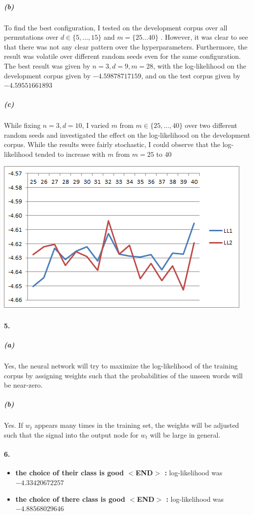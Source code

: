 \documentclass[10pt,letter]{article}
\begin{document}
\subparagraph*{(b)}
To find the best configuration, I tested on the development corpus over all permutations over $d\in\{5,...,15\}$ and $m=\{25...40\}$ . However, it was clear to see that there was not any clear pattern over the hyperparameters. Furthermore, the result was volatile over different random seeds even for the same configuration. The best result was given by $n=3, d=9, m=28$, with the log-likelihood on the development corpus given by $-4.59878717159$, and on the test corpus given by $-4.59551661893$
\subparagraph*{(c)}

While fixing $n=3, d=10$, I varied $m$ from $m\in\{25,...,40\}$ over two different random seeds and investigated the effect on the log-likelihood on the development corpus. While the results were fairly stochastic, I could observe that the log-likelihood tended to increase with $m$ from $m=25$ to $40$

\centerline{\includegraphics[scale=1.0]{LL-over-m-copy.png}}

\paragraph*{5.}
\subparagraph{(a)}
Yes, the neural network will try to maximize the log-likelihood of the training corpus by assigning weights such that the probabilities of the unseen words will be near-zero. 
\subparagraph{(b)}

Yes. If $w_t$ appears many times in the training set, the weights will be adjusted such that the signal into the output node for $w_t$ will be large in general. 

\paragraph*{6.}

\begin{itemize}
	\item \textbf{the choice of their class is good $<$END$>$ : } log-likelihood was $-4.33420672257$
	\item \textbf{the choice of there class is good $<$END$>$ : } log-likelihood was $-4.88568029646$
\end{itemize}
\end{document}
